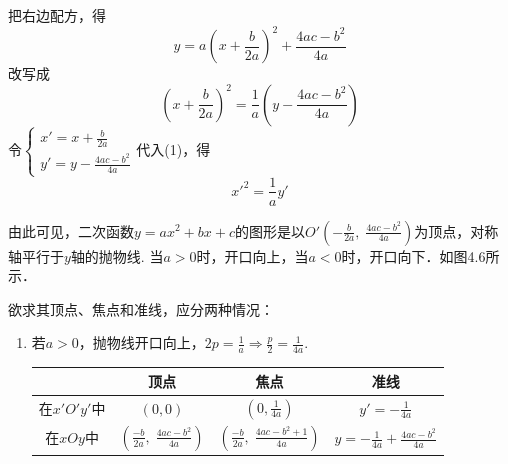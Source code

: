 \begin{solution}
   把右边配方，得 
\[y=a\left(x+\frac{b}{2a}\right)^2+\frac{4ac-b^2}{4a}\]
改写成
\begin{equation}
    \left(x+\frac{b}{2a}\right)^2=\frac{1}{a}\left(y-\frac{4ac-b^2}{4a}\right) \tag{1}
\end{equation}
令$\begin{cases}
    x'=x+\frac{b}{2a}\\[1.5ex]
    y'=y-\frac{4ac-b^2}{4a}
\end{cases}$代入(1)，得
\begin{equation}
    {x'}^2=\frac{1}{a}{y'}
\end{equation}

由此可见，二次函数$y=ax^2+bx+c$的图形是以$O'\left(-\frac{b}{2a},\; \frac{4ac-b^2}{4a}\right)$为顶点，对称轴平行于$y$轴的抛物线. 当$a>0$时，开口向上，当$a<0$时，开口向下．如图4.6所示．
\begin{figure}[htp]
    \centering
{}
    \caption{}
\end{figure}

欲求其顶点、焦点和准线，应分两种情况：
\begin{enumerate}[(1)]
    \item 若$a>0$，抛物线开口向上，$2p=\frac{1}{a}\Rightarrow \frac{p}{2}=\frac{1}{4a}$.
\begin{center}
\begin{tabular}{c|ccc}
\hline
& 顶点 & 焦点& 准线\\
\hline
在$x'O'y'$中 &  $(0,0)$ &  $\left(0,\frac{1}{4a}\right)$ &  $y'=-\frac{1}{4a}$\\
在$xOy$中 &  $\left(\frac{-b}{2a},\; \frac{4ac-b^2}{4a}\right)$ &  $\left(\frac{-b}{2a},\; \frac{4ac-b^2+1}{4a}\right)$ &  $y=-\frac{1}{4a}+\frac{4ac-b^2}{4a}$\\
\hline
\end{tabular}
\end{center}


\end{enumerate}
\end{solution}
